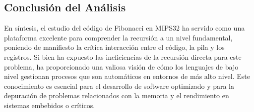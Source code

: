 \documentclass{article}
\begin{document}
\subsection*{\Large Conclusión del Análisis}
En síntesis, el estudio del código de Fibonacci en MIPS32 ha servido como una plataforma excelente para comprender la recursión a un nivel fundamental, poniendo de manifiesto la crítica interacción entre el código, la pila y los registros. Si bien ha expuesto las ineficiencias de la recursión directa para este problema, ha proporcionado una valiosa visión de cómo los lenguajes de bajo nivel gestionan procesos que son automáticos en entornos de más alto nivel. Este conocimiento es esencial para el desarrollo de software optimizado y para la depuración de problemas relacionados con la memoria y el rendimiento en sistemas embebidos o críticos.
\end{document}
